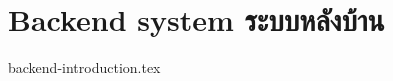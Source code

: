 \section{\ifenglish Backend system \else ระบบหลังบ้าน \fi}

\newcommand{\dir}{chapters/approach/backend}
{backend-introduction.tex}
